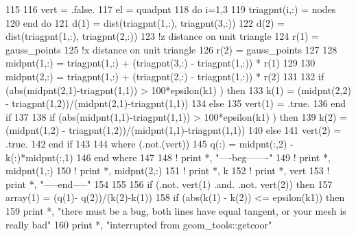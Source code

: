 \begin{DoxyCode}
115           
116             vert = .false.
117             el = quadpnt%
118             \textcolor{keywordflow}{do} i=1,3
119               triagpnt(i,:) = nodes%
120 \textcolor{keywordflow}{            end do}
121             d(1) = dist(triagpnt(1,:), triagpnt(3,:))
122             d(2) = dist(triagpnt(1,:), triagpnt(2,:))
123             \textcolor{comment}{!z distance on unit triangle}
124             r(1) = gauss_points%
125             \textcolor{comment}{!x distance on unit triangle}
126             r(2) = gauss_points%
127             
128             midpnt(1,:) = triagpnt(1,:) + (triagpnt(3,:) - triagpnt(1,:)) * r(1)
129             
130             midpnt(2,:) = triagpnt(1,:) + (triagpnt(2,:) - triagpnt(1,:)) * r(2)
131             
132             \textcolor{keywordflow}{if} (abs(midpnt(2,1)-triagpnt(1,1)) > 100*epsilon(k1) ) \textcolor{keywordflow}{then}
133               k(1) = (midpnt(2,2) - triagpnt(1,2))/(midpnt(2,1)-triagpnt(1,1))
134             \textcolor{keywordflow}{else}
135               vert(1) = .true.
136 \textcolor{keywordflow}{            end if}
137             
138             \textcolor{keywordflow}{if} (abs(midpnt(1,1)-triagpnt(1,1)) > 100*epsilon(k1) ) \textcolor{keywordflow}{then}
139               k(2) = (midpnt(1,2) - triagpnt(1,2))/(midpnt(1,1)-triagpnt(1,1))
140             \textcolor{keywordflow}{else}
141               vert(2) = .true.
142 \textcolor{keywordflow}{            end if}
143             
144             \textcolor{keywordflow}{where} (.not.(vert))
145               q(:) = midpnt(:,2) - k(:)*midpnt(:,1)
146 \textcolor{keywordflow}{            end where}
147             
148 \textcolor{comment}{!           print *, "----beg-------"}
149 \textcolor{comment}{!           print *, midpnt(1,:)}
150 \textcolor{comment}{!           print *, midpnt(2,:)}
151 \textcolor{comment}{!           print *, k}
152 \textcolor{comment}{!           print *, vert}
153 \textcolor{comment}{!           print *, "-----end-----"}
154             
155             
156             \textcolor{keywordflow}{if} (.not. vert(1) .and. .not. vert(2)) \textcolor{keywordflow}{then}
157               array(1) = (q(1)- q(2))/(k(2)-k(1))
158               \textcolor{keywordflow}{if} (abs(k(1) - k(2)) <= epsilon(k1)) \textcolor{keywordflow}{then}
159                 print *, \textcolor{stringliteral}{"there must be a bug, both lines have equal tangent, or your mesh is really bad"}
160                 print *, \textcolor{stringliteral}{"interrupted from geom\_tools::getcoor"}

\end{DoxyCode}
